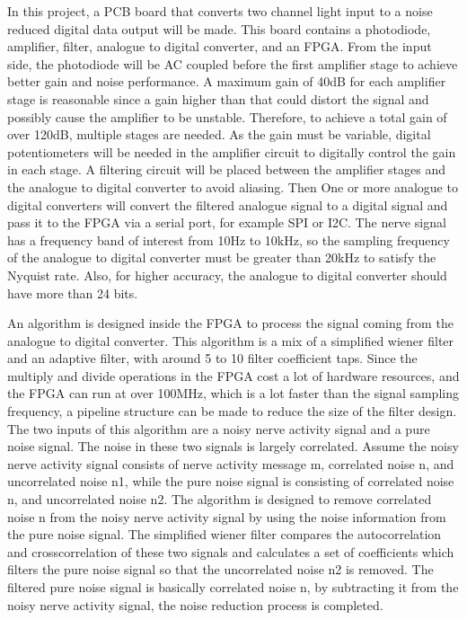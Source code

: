 In this project, a PCB board that converts two channel light input to a noise reduced digital data output will be made.  This board contains a photodiode, amplifier, filter, analogue to digital converter, and an FPGA.  From the input side, the photodiode will be AC coupled before the first amplifier stage to achieve better gain and noise performance.  A maximum gain of 40dB for each amplifier stage is reasonable since a gain higher than that could distort the signal and possibly cause the amplifier to be unstable.  Therefore, to achieve a total gain of over 120dB, multiple stages are needed.  As the gain must be variable, digital potentiometers will be needed in the amplifier circuit to digitally control the gain in each stage.  A filtering circuit will be placed between the amplifier stages and the analogue to digital converter to avoid aliasing.  Then One or more analogue to digital converters will convert the filtered analogue signal to a digital signal and pass it to the FPGA via a serial port, for example SPI or I2C.  The nerve signal has a frequency band of interest from 10Hz to 10kHz, so the sampling frequency of the analogue to digital converter must be greater than 20kHz to satisfy the Nyquist rate.  Also, for higher accuracy, the analogue to digital converter should have more than 24 bits.

An algorithm is designed inside the FPGA to process the signal coming from the analogue to digital converter.  This algorithm is a mix of a simplified wiener filter and an adaptive filter, with around 5 to 10 filter coefficient taps.  Since the multiply and divide operations in the FPGA cost a lot of hardware resources, and the FPGA can run at over 100MHz, which is a lot faster than the signal sampling frequency, a pipeline structure can be made to reduce the size of the filter design.  The two inputs of this algorithm are a noisy nerve activity signal and a pure noise signal.  The noise in these two signals is largely correlated.  Assume the noisy nerve activity signal consists of nerve activity message m, correlated noise n, and uncorrelated noise n1, while the pure noise signal is consisting of correlated noise n, and uncorrelated noise n2.  The algorithm is designed to remove correlated noise n from the noisy nerve activity signal by using the noise information from the pure noise signal.  The simplified wiener filter compares the autocorrelation and crosscorrelation of these two signals and calculates a set of coefficients which filters the pure noise signal so that the uncorrelated noise n2 is removed.  The filtered pure noise signal is basically correlated noise n, by subtracting it from the noisy nerve activity signal, the noise reduction process is completed.

